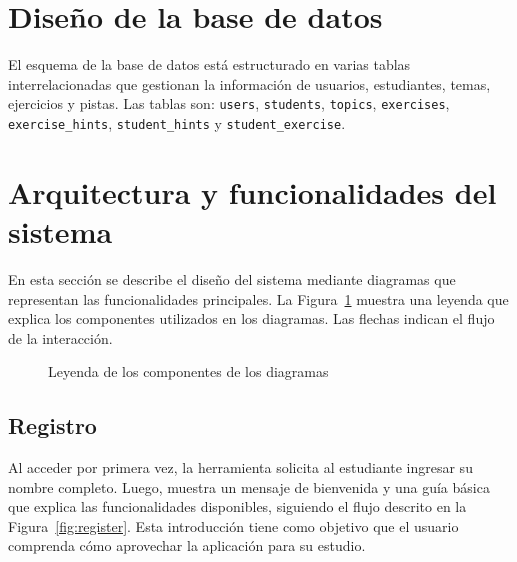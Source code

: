 \documentclass{article}
\begin{document}
\section{Diseño de la base de datos}\label{sec:database}

El esquema de la base de datos está estructurado en varias tablas interrelacionadas que gestionan la información de usuarios, estudiantes, temas, ejercicios y pistas. Las tablas son: \texttt{users}, \texttt{students}, \texttt{topics}, \texttt{exercises}, \texttt{exercise\_hints}, \texttt{student\_hints} y \texttt{student\_exercise}.

\section{Arquitectura y funcionalidades del sistema}\label{sec:features}

En esta sección se describe el diseño del sistema mediante diagramas que representan las funcionalidades principales. La Figura~\ref{fig:legend} muestra una leyenda que explica los componentes utilizados en los diagramas. Las flechas indican el flujo de la interacción.

\begin{figure}[h!]
  \centering
      \caption{Leyenda de los componentes de los diagramas}\label{fig:legend}
\end{figure}

\subsection{Registro}

Al acceder por primera vez, la herramienta solicita al estudiante ingresar su nombre completo. Luego, muestra un mensaje de bienvenida y una guía básica que explica las funcionalidades disponibles, siguiendo el flujo descrito en la Figura~\ref{fig:register}. Esta introducción tiene como objetivo que el usuario comprenda cómo aprovechar la aplicación para su estudio.
\end{document}
